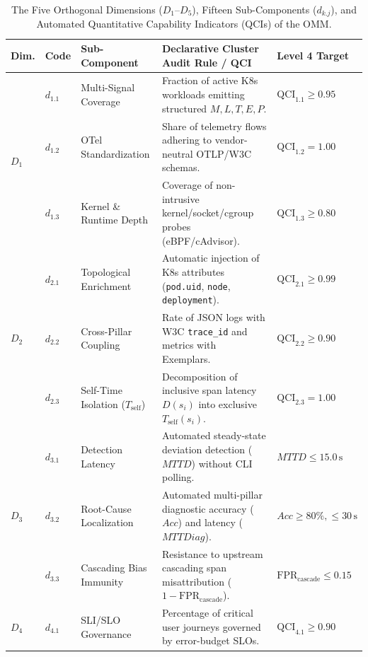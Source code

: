 \begin{table}[!ht]
\centering
\caption{The Five Orthogonal Dimensions ($D_1$--$D_5$), Fifteen Sub-Components ($d_{k.j}$), and Automated Quantitative Capability Indicators (QCIs) of the OMM.}
\label{tab:omm-dimensions-qci}
\fontsize{8}{9.5}\selectfont
\renewcommand{\arraystretch}{1.18}
\begin{tabularx}{\textwidth}{@{} l l p{3.6cm} X l @{}}
\toprule
\textbf{Dim.} & \textbf{Code} & \textbf{Sub-Component} & \textbf{Declarative Cluster Audit Rule / QCI} & \textbf{Level 4 Target} \\
\midrule
\multirow{3}{*}{\textbf{$D_1$}} & $d_{1.1}$ & Multi-Signal Coverage & Fraction of active K8s workloads emitting structured $M, L, T, E, P$. & $\text{QCI}_{1.1} \ge 0.95$ \\
 & $d_{1.2}$ & OTel Standardization & Share of telemetry flows adhering to vendor-neutral OTLP/W3C schemas. & $\text{QCI}_{1.2} = 1.00$ \\
 & $d_{1.3}$ & Kernel \& Runtime Depth & Coverage of non-intrusive kernel/socket/cgroup probes (eBPF/cAdvisor). & $\text{QCI}_{1.3} \ge 0.80$ \\
\midrule
\multirow{3}{*}{\textbf{$D_2$}} & $d_{2.1}$ & Topological Enrichment & Automatic injection of K8s attributes (\texttt{pod.uid}, \texttt{node}, \texttt{deployment}). & $\text{QCI}_{2.1} \ge 0.99$ \\
 & $d_{2.2}$ & Cross-Pillar Coupling & Rate of JSON logs with W3C \texttt{trace\_id} and metrics with Exemplars. & $\text{QCI}_{2.2} \ge 0.90$ \\
 & $d_{2.3}$ & Self-Time Isolation ($T_{\text{self}}$) & Decomposition of inclusive span latency $D(s_i)$ into exclusive $T_{\text{self}}(s_i)$. & $\text{QCI}_{2.3} = 1.00$ \\
\midrule
\multirow{3}{*}{\textbf{$D_3$}} & $d_{3.1}$ & Detection Latency & Automated steady-state deviation detection ($MTTD$) without CLI polling. & $MTTD \le 15.0\,\text{s}$ \\
 & $d_{3.2}$ & Root-Cause Localization & Automated multi-pillar diagnostic accuracy ($Acc$) and latency ($MTTDiag$). & $Acc \ge 80\%, \le 30\,\text{s}$ \\
 & $d_{3.3}$ & Cascading Bias Immunity & Resistance to upstream cascading span misattribution ($1 - \text{FPR}_{\text{cascade}}$). & $\text{FPR}_{\text{cascade}} \le 0.15$ \\
\midrule
\multirow{3}{*}{\textbf{$D_4$}} & $d_{4.1}$ & SLI/SLO Governance & Percentage of critical user journeys governed by error-budget SLOs. & $\text{QCI}_{4.1} \ge 0.90$ \\

\end{tabularx}
\end{table}
